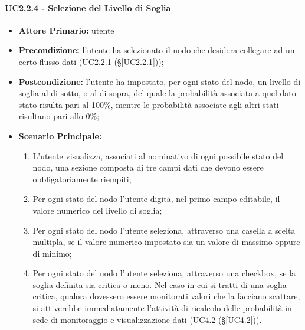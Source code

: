 \paragraph{UC2.2.4 - Selezione del Livello di Soglia}\label{UC2.2.4}
\begin{itemize}
\item \textbf{Attore Primario:} utente
\item \textbf{Precondizione:} l'utente ha selezionato il nodo che desidera collegare ad un certo flusso dati 					(\hyperref[UC2.2.1]{UC2.2.1 (§\ref*{UC2.2.1})});
\item \textbf{Postcondizione:} l'utente ha impostato, per ogni stato del nodo, un livello di soglia al di sotto, o al di sopra,	del quale la probabilità associata a quel dato stato risulta pari al 100\%, mentre le probabilità associate agli altri stati risultano pari allo 0\%;
\item \textbf{Scenario Principale:}
	\begin{enumerate}
	\item L'utente visualizza, associati al nominativo di ogni possibile stato del nodo, una sezione composta di tre campi dati che devono essere obbligatoriamente riempiti;
	\item Per ogni stato del nodo l'utente digita, nel primo campo editabile, il valore numerico del livello di soglia;
	\item Per ogni stato del nodo l'utente seleziona, attraverso una casella a scelta multipla, se il valore numerico impostato sia un valore di massimo oppure di minimo;
	\item Per ogni stato del nodo l'utente seleziona, attraverso una checkbox, se la soglia definita sia critica o meno. Nel caso in cui si tratti di una soglia critica, qualora dovessero essere monitorati valori che la facciano scattare, si attiverebbe immediatamente l'attività di ricalcolo delle probabilità in sede di monitoraggio e visualizzazione dati (\hyperref[UC4.2]{UC4.2 (§\ref*{UC4.2})}).
	\end{enumerate}
\end{itemize}

